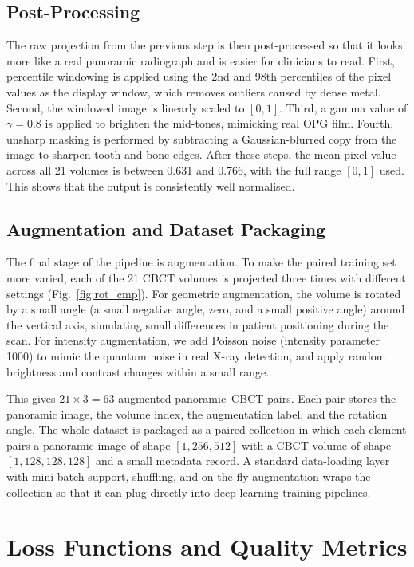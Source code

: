 \documentclass[conference]{IEEEtran}
\begin{document}
\subsection{Post-Processing}
The raw projection from the previous step is then post-processed so that it looks more like a real panoramic radiograph and is easier for clinicians to read. First, percentile windowing is applied using the 2nd and 98th percentiles of the pixel values as the display window, which removes outliers caused by dense metal. Second, the windowed image is linearly scaled to $[0, 1]$. Third, a gamma value of $\gamma = 0.8$ is applied to brighten the mid-tones, mimicking real OPG film. Fourth, unsharp masking is performed by subtracting a Gaussian-blurred copy from the image to sharpen tooth and bone edges.
After these steps, the mean pixel value across all 21 volumes is between 0.631 and 0.766, with the full range $[0, 1]$ used. This shows that the output is consistently well normalised.

\subsection{Augmentation and Dataset Packaging}
The final stage of the pipeline is augmentation. To make the paired training set more varied, each of the 21 CBCT volumes is projected three times with different settings (Fig.~\ref{fig:rot_cmp}). For geometric augmentation, the volume is rotated by a small angle (a small negative angle, zero, and a small positive angle) around the vertical axis, simulating small differences in patient positioning during the scan. For intensity augmentation, we add Poisson noise (intensity parameter 1000) to mimic the quantum noise in real X-ray detection, and apply random brightness and contrast changes within a small range.

This gives $21 \times 3 = 63$ augmented panoramic--CBCT pairs. Each pair stores the panoramic image, the volume index, the augmentation label, and the rotation angle. The whole dataset is packaged as a paired collection in which each element pairs a panoramic image of shape $[1, 256, 512]$ with a CBCT volume of shape $[1, 128, 128, 128]$ and a small metadata record. A standard data-loading layer with mini-batch support, shuffling, and on-the-fly augmentation wraps the collection so that it can plug directly into deep-learning training pipelines.

\section{Loss Functions and Quality Metrics}
\label{sec:loss}
\end{document}
